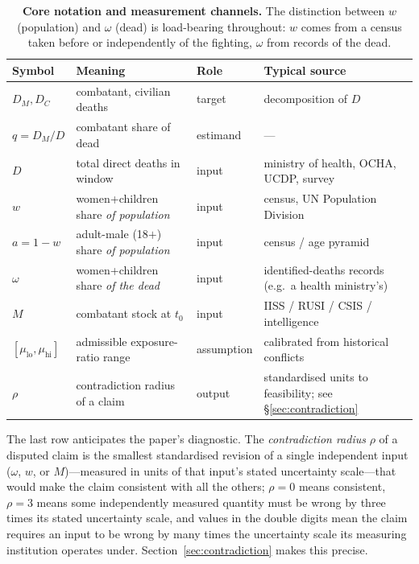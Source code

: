 \begin{table}[ht]
\centering
\caption{\textbf{Core notation and measurement channels.} The distinction between $w$ (population) and $\omega$ (dead) is load-bearing throughout: $w$ comes from a census taken before or independently of the fighting, $\omega$ from records of the dead.}
\label{tab:notation}
\begin{small}
\renewcommand{\arraystretch}{1.3}
\begin{tabularx}{\textwidth}{@{}lll>{\raggedright\arraybackslash}X@{}}
\toprule
Symbol & Meaning & Role & Typical source \\
\midrule
$D_M, D_C$       & combatant, civilian deaths  & target   & decomposition of $D$ \\
$q=D_M/D$        & combatant share of dead     & estimand & --- \\
\addlinespace
$D$              & total direct deaths in window & input    & ministry of health, OCHA, UCDP, survey \\
$w$              & women+children share \emph{of population} & input & census, UN Population Division \\
$a=1-w$          & adult-male (18$+$) share \emph{of population} & input & census / age pyramid \\
$\omega$         & women+children share \emph{of the dead} & input   & identified-deaths records (e.g.\ a health ministry's) \\
$M$              & combatant stock at $t_0$    & input    & IISS / RUSI / CSIS / intelligence \\
\addlinespace
$[\mu_{\mathrm{lo}},\mu_{\mathrm{hi}}]$ & admissible exposure-ratio range & assumption & calibrated from historical conflicts \\
$\rho$           & contradiction radius of a claim  & output   & standardised units to feasibility; see \S\ref{sec:contradiction} \\
\bottomrule
\end{tabularx}
\end{small}
\end{table}

The last row anticipates the paper's diagnostic. The \emph{contradiction radius} $\rho$ of a disputed claim is the smallest standardised revision of a single independent input ($\omega$, $w$, or $M$)---measured in units of that input's stated uncertainty scale---that would make the claim consistent with all the others; $\rho=0$ means consistent, $\rho=3$ means some independently measured quantity must be wrong by three times its stated uncertainty scale, and values in the double digits mean the claim requires an input to be wrong by many times the uncertainty scale its measuring institution operates under. Section~\ref{sec:contradiction} makes this precise.

